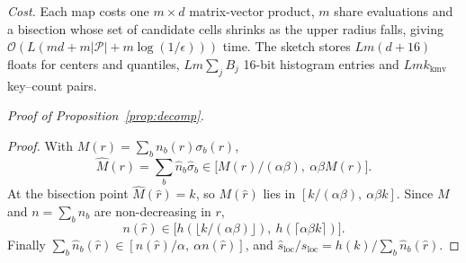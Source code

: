 \documentclass[sigconf,nonacm]{acmart}
\newcommand{\sloc}{s_{\text{loc}}}
\begin{document}
\emph{Cost.} Each map costs one $m\times d$ matrix-vector product, $m$ share evaluations and a bisection whose set of candidate cells shrinks as the upper radius falls, giving $\mathcal{O}(L(md + m|\mathcal{P}| + m\log(1/\epsilon)))$ time. The sketch stores $Lm(d+16)$ floats for centers and quantiles, $Lm\sum_j B_j$ 16-bit histogram entries and $Lmk_{\text{kmv}}$ key--count pairs.

\emph{Proof of Proposition~\ref{prop:decomp}.}
\begin{proof}
With $M(r)=\sum_b n_b(r)\sigma_b(r)$,
\[
\hat M(r)=\textstyle\sum_b\hat n_b\hat\sigma_b\in\big[M(r)/(\alpha\beta),\ \alpha\beta M(r)\big].
\]
At the bisection point $\hat M(\hat r)=k$, so $M(\hat r)$ lies in $[k/(\alpha\beta),\ \alpha\beta k]$. Since $M$ and $n=\sum_b n_b$ are non-decreasing in $r$,
\[
n(\hat r)\in\big[h(\lfloor k/(\alpha\beta)\rfloor),\ h(\lceil\alpha\beta k\rceil)\big].
\] Finally $\sum_b\hat n_b(\hat r)\in[n(\hat r)/\alpha,\ \alpha n(\hat r)]$, and $\hat s_{\text{loc}}/\sloc = h(k)/\sum_b\hat n_b(\hat r)$.
\end{proof}
\end{document}
